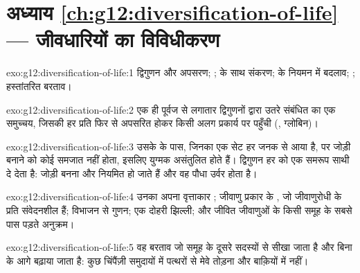 \section*{अध्याय \ref{ch:g12:diversification-of-life} --- जीवधारियों का विविधीकरण}

\begin{solution}{exo:g12:diversification-of-life:1}
 द्विगुणन और अपसरण; ;  के साथ संकरण;  के नियमन में बदलाव; ; हस्तांतरित बरताव।
\end{solution}

\begin{solution}{exo:g12:diversification-of-life:2}
एक ही पूर्वज  से लगातार द्विगुणनों द्वारा उतरे संबंधित  का एक
समुच्चय, जिसकी हर प्रति फिर  से अपसरित होकर किसी अलग प्रकार्य पर
पहुँची (, ग्लोबिन)।
\end{solution}

\begin{solution}{exo:g12:diversification-of-life:3}
उसके  के पास, जिनका एक सेट हर जनक  से आया है,  पर जोड़ी बनाने को कोई समजात नहीं होता, इसलिए युग्मक असंतुलित होते
हैं। द्विगुणन हर  को एक समरूप साथी दे देता है: जोड़ी बनना और
 नियमित हो जाते हैं और वह पौधा उर्वर होता है।
\end{solution}

\begin{solution}{exo:g12:diversification-of-life:4}
उनका अपना वृत्ताकार ; जीवाणु प्रकार के , जो जीवाणुरोधी
 के प्रति संवेदनशील हैं; विभाजन से गुणन; एक दोहरी झिल्ली; और
जीवित जीवाणुओं के किसी समूह के सबसे पास पड़ते अनुक्रम।
\end{solution}

\begin{solution}{exo:g12:diversification-of-life:5}
वह बरताव जो समूह के दूसरे सदस्यों से सीखा जाता है और बिना  के आगे
बढ़ाया जाता है: कुछ चिंपैंज़ी समुदायों में पत्थरों से मेवे तोड़ना और
बाक़ियों में नहीं।
\end{solution}

